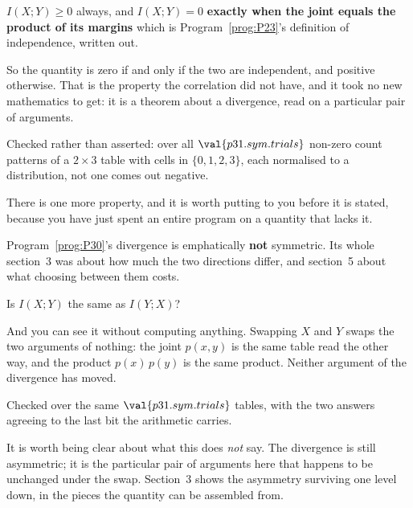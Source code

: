 \begin{fr}
\begin{ansblock}
$I(X; Y) \ge 0$ always, and $I(X; Y) = 0$ \textbf{exactly when the joint
equals the product of its margins} \dash{} which is
Program~\ref{prog:P23}'s definition of independence, written out.
\end{ansblock}

So the quantity is zero if and only if the two are independent, and positive
otherwise. That is the property the correlation did not have, and it took no
new mathematics to get: it is a theorem about a divergence, read on a
particular pair of arguments.

Checked rather than asserted: over all $\val{p31.sym.trials}$ non-zero count
patterns of a $2 \times 3$ table with cells in $\{0, 1, 2, 3\}$, each
normalised to a distribution, not one comes out negative.
\end{fr}

\begin{fr}
There is one more property, and it is worth putting to you before it is
stated, because you have just spent an entire program on a quantity that
lacks it.

Program~\ref{prog:P30}'s divergence is emphatically \textbf{not} symmetric.
Its whole section~3 was about how much the two directions differ, and
section~5 about what choosing between them costs.

Is $I(X; Y)$ the same as $I(Y; X)$?
\dotline
\nextframe
\end{fr}

\begin{fr}

And you can see it without computing anything. Swapping $X$ and $Y$ swaps
the two arguments of nothing: the joint $p(x, y)$ is the same table read the
other way, and the product $p(x)\,p(y)$ is the same product. Neither argument
of the divergence has moved.

Checked over the same $\val{p31.sym.trials}$ tables, with the two answers
agreeing to the last bit the arithmetic carries.

\begin{note}
It is worth being clear about what this does \emph{not} say. The divergence
is still asymmetric; it is the particular pair of arguments here that happens
to be unchanged under the swap. Section~3 shows the asymmetry surviving one
level down, in the pieces the quantity can be assembled from.
\end{note}
\end{fr}

